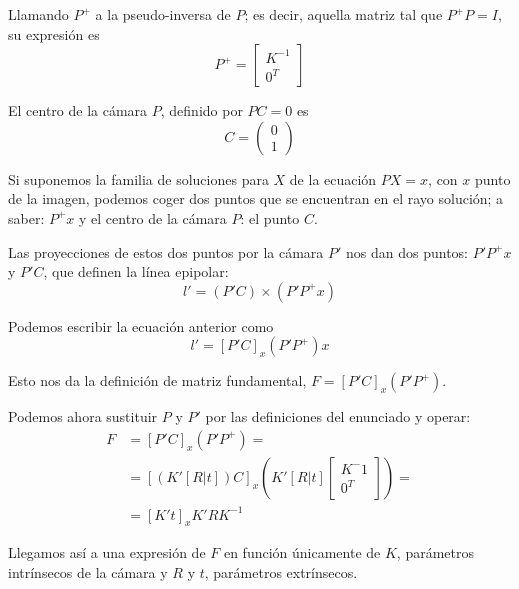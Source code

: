 Llamando $P^+$ a la pseudo-inversa de $P$; es decir, aquella matriz tal que $P^+ P = I$, su expresión es
\[
P^+ = \left[\begin{array}{c}
K^{-1} \\
0^T
\end{array}\right]
\]

El centro de la cámara $P$, definido por $PC = 0$ es
\[
C = \left(\begin{array}{c}
0 \\
1
\end{array}\right)
\]

Si suponemos la familia de soluciones para $X$ de la ecuación $PX = x$, con $x$ punto de la imagen, podemos coger dos puntos que se encuentran en el rayo solución; a saber: $P^+x$ y el centro de la cámara $P$: el punto $C$.

Las proyecciones de estos dos puntos por la cámara $P'$ nos dan dos puntos: $P'P^+x$ y $P'C$, que definen la línea epipolar:
\[
l' = (P'C) \times (P'P^+x)
\]

Podemos escribir la ecuación anterior como
\[
l' =[P'C]_x(P'P^+)x
\]

Esto nos da la definición de matriz fundamental, $F = [P'C]_x(P'P^+)$.

Podemos ahora sustituir $P$ y $P'$ por las definiciones del enunciado y operar:
\begin{align*}
	F &= [P'C]_x(P'P^+) = \\
	&= [(K'[R|t])C]_x(K'[R|t]\left[\begin{array}{c}
		K^-1 \\
		0^T
	\end{array}\right]) = \\
	&= [K't]_xK'RK^{-1}
\end{align*}

Llegamos así a una expresión de $F$ en función únicamente de $K$, parámetros intrínsecos de la cámara y $R$ y $t$, parámetros extrínsecos.


